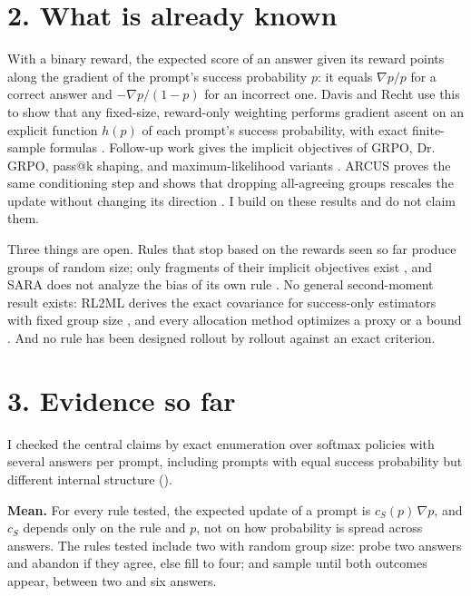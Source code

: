 \documentclass[11pt]{article}
\begin{document}
\section{2. What is already known}
With a binary reward, the expected score of an answer given its reward points along the gradient of the prompt's success probability $p$: it equals $\nabla p/p$ for a correct answer and $-\nabla p/(1-p)$ for an incorrect one. Davis and Recht use this to show that any fixed-size, reward-only weighting performs gradient ascent on an explicit function $h(p)$ of each prompt's success probability, with exact finite-sample formulas \citep{davis2025objective}. Follow-up work gives the implicit objectives of GRPO, Dr. GRPO, pass@k shaping, and maximum-likelihood variants \citep{mroueh2025grpo,thrampoulidis2025shaping,zheng2026rl2ml,tajwar2026maxrl,heckel2026asym}. ARCUS proves the same conditioning step and shows that dropping all-agreeing groups rescales the update without changing its direction \citep{okonkwo2026arcus}. I build on these results and do not claim them.

Three things are open. Rules that stop based on the rewards seen so far produce groups of random size; only fragments of their implicit objectives exist \citep{okonkwo2026arcus,davis2025objective,xiong2025reinforceada}, and SARA does not analyze the bias of its own rule \citep{sara2026}. No general second-moment result exists: RL2ML derives the exact covariance for success-only estimators with fixed group size \citep{zheng2026rl2ml}, and every allocation method optimizes a proxy or a bound \citep{yao2025gvm,xiong2025reinforceada,sara2026}. And no rule has been designed rollout by rollout against an exact criterion.

\section{3. Evidence so far}
I checked the central claims by exact enumeration over softmax policies with several answers per prompt, including prompts with equal success probability but different internal structure ().

\textbf{Mean.} For every rule tested, the expected update of a prompt is $c_S(p)\,\nabla p$, and $c_S$ depends only on the rule and $p$, not on how probability is spread across answers. The rules tested include two with random group size: probe two answers and abandon if they agree, else fill to four; and sample until both outcomes appear, between two and six answers.
\end{document}
